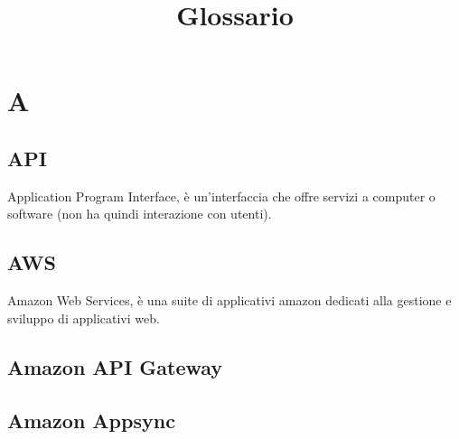 \documentclass{classes/base}
\title{Glossario}
\author{\giulio}
\begin{document}
	\maketitle
	\newpage
	\tableofcontents
	

    \section*{A}
        \subsection*{API}
        Application Program Interface, è un'interfaccia che offre servizi a computer o software (non ha quindi interazione con utenti).
       
        \subsection*{AWS}
        Amazon Web Services, è una suite di applicativi amazon dedicati alla gestione e sviluppo di applicativi web.

        \subsection*{Amazon API Gateway}

        \subsection*{Amazon Appsync}
\end{document}

